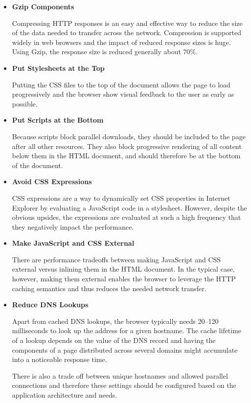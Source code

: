 \begin{itemize}
\item \textbf{Gzip Components}

  Compressing HTTP responses is an easy and effective way to reduce
  the size of the data needed to transfer across the
  network. Compression is supported widely in web browsers and the
  impact of reduced response sizes is huge. Using Gzip, the response
  size is reduced generally about 70\%.

\item \textbf{Put Stylesheets at the Top}

  Putting the CSS files to the top of the document allows the page to
  load progressively and the browser show visual feedback to the user
  as early as possible.

\item \textbf{Put Scripts at the Bottom}

  Because scripts block parallel downloads, they should be included to
  the page after all other resources. They also block progressive
  rendering of all content below them in the HTML document, and should
  therefore be at the bottom of the document.

\item \textbf{Avoid CSS Expressions}

  CSS expressions are a way to dynamically set CSS properties in
  Internet Explorer by evaluating a JavaScript code in a
  stylesheet. However, despite the obvious upsides, the expressions
  are evaluated at such a high frequency that they negatively impact
  the performance.

\item \textbf{Make JavaScript and CSS External}

  There are performance tradeoffs between making JavaScript and CSS
  external versus inlining them in the HTML document. In the typical
  case, however, making them external enables the browser to leverage
  the HTTP caching semantics and thus reduces the needed network
  transfer.

\item \textbf{Reduce DNS Lookups}

  Apart from cached DNS lookups, the browser typically needs 20--120
  milliseconds to look up the  address for a given
  hostname. The cache lifetime of a lookup depends on the 
  value of the DNS record and having the components of a page
  distributed across several domains might accumulate into a
  noticeable response time.

  There is also a trade off between unique hostnames and allowed
  parallel connections and therefore these settings should be
  configured based on the application architecture and needs.


\end{itemize}
